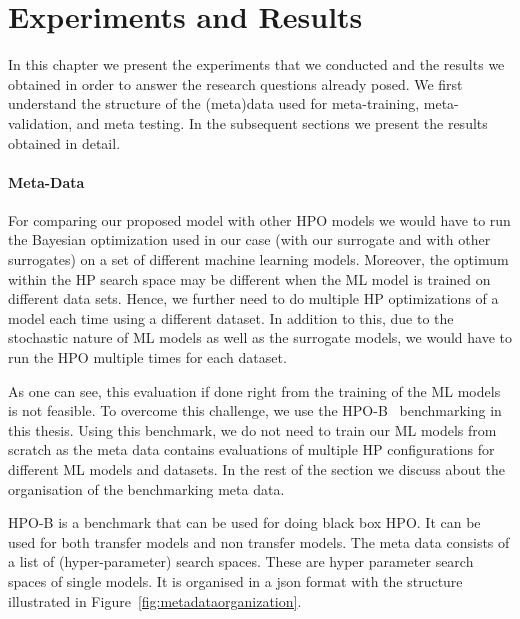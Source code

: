\documentclass[12pt, twoside, ngerman]{report}
\begin{document}
\chapter{Experiments and Results}

In this chapter we present the experiments that we conducted and the results we obtained in order to answer the research questions already posed.
We first understand the structure of the (meta)data used for meta-training,  meta-validation,  and meta testing.
In the subsequent sections we present the results obtained in detail.

\subsubsection{Meta-Data}

For comparing our proposed model with other HPO models we would have to run the Bayesian optimization used in our case (with our surrogate and with other surrogates) on a set of different machine learning models.
Moreover,  the optimum within the HP search space may be different when the ML model is trained on different data sets.
Hence, we further need to do multiple HP optimizations of a model each time using a different dataset.
In addition to this, due to the stochastic nature of ML models as well as the surrogate models, 
we would have to run the HPO multiple times for each dataset.

As one can see,  this evaluation if done right from the training of the ML models is not feasible.
To overcome this challenge,  we use the HPO-B~\cite{DBLP:journals/corr/abs-2106-06257} benchmarking in this thesis.
Using this benchmark,  we do not need to train our ML models from scratch as the meta data contains evaluations of multiple HP configurations for different ML models and datasets.
In the rest of the section we discuss about the organisation of the benchmarking meta data.


HPO-B is a benchmark that can be used for doing black box HPO.
It can be used for both transfer models and non transfer models.
The meta data consists of a list of (hyper-parameter) search spaces.
These are hyper parameter search spaces of single models.
It is organised in a json format with the structure illustrated in Figure~\ref{fig:metadataorganization}.
\end{document}
